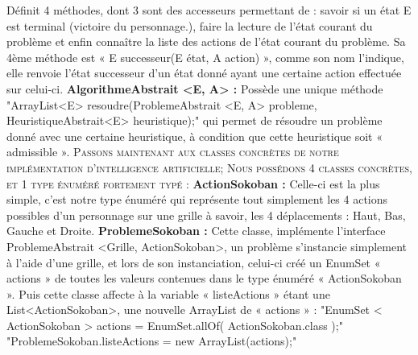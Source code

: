 \documentclass[a4paper,12pt]{article} %
\begin{document}
Définit 4 méthodes, dont 3 sont des accesseurs permettant de :
savoir si un état E est terminal (victoire du personnage.),
faire la lecture de l’état courant du problème et enfin connaître la liste des actions de l’état courant du problème.
\newline
Sa 4ème méthode est « E successeur(E état, A action) », comme son nom l’indique, elle renvoie l’état successeur d’un état donné ayant une certaine action effectuée sur celui-ci.
\newline\newline
\noindent
\textbf{AlgorithmeAbstrait <E, A> :}
\newline\newline
Possède une unique méthode
\newline
"ArrayList<E> resoudre(ProblemeAbstrait <E, A> probleme, HeuristiqueAbstrait<E> heuristique);"
\newline
qui permet de résoudre un problème donné avec une certaine heuristique, à condition que cette heuristique soit « admissible ». 
\newpage
\noindent
\textsc{Passons maintenant aux classes concrètes de notre implémentation d’intelligence artificielle;
Nous possédons 4 classes concrètes, et 1 type énuméré fortement typé :}
\noindent
\newline\newline
\textbf{ActionSokoban :}
\newline\newline
Celle-ci est la plus simple, c’est notre type énuméré qui représente tout simplement les 4 actions possibles d’un personnage sur une grille à savoir, les 4 déplacements : Haut, Bas, Gauche et Droite.
\noindent
\newline\newline
\textbf{ProblemeSokoban :}
\newline\newline
Cette classe, implémente l’interface ProblemeAbstrait <Grille, ActionSokoban>, un problème s’instancie simplement à l’aide d’une grille, et lors de son instanciation, celui-ci créé un EnumSet « actions » de toutes les valeurs contenues dans le type énuméré « ActionSokoban ».
\newline
Puis cette classe affecte à la variable « listeActions » étant une List<ActionSokoban>, une nouvelle ArrayList de « actions » :
\newline\newline
"EnumSet < ActionSokoban > actions = EnumSet.allOf( ActionSokoban.class );"
\newline
\indent\indent "ProblemeSokoban.listeActions = new ArrayList(actions);"
\end{document}
